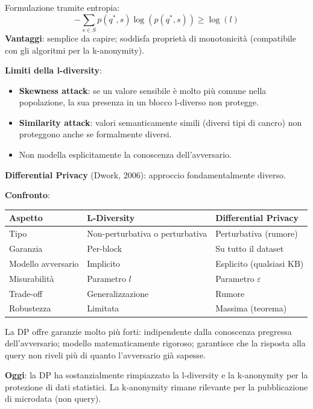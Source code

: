 \documentclass[a4paper,11pt]{article}
\begin{document}
Formulazione tramite entropia:
\[
-\sum_{s \in S} p(q^*, s) \log(p(q^*, s)) \geq \log(l)
\]
\textbf{Vantaggi}: semplice da capire; soddisfa propriet\`{a} di monotonicità (compatibile con gli algoritmi per la k-anonymity).

\textbf{Limiti della l-diversity}:
\begin{itemize}
  \item \textbf{Skewness attack}: se un valore sensibile \`{e} molto pi\`{u} comune nella popolazione, la sua presenza in un blocco l-diverso non protegge.
  \item \textbf{Similarity attack}: valori semanticamente simili (diversi tipi di cancro) non proteggono anche se formalmente diversi.
  \item Non modella esplicitamente la conoscenza dell'avversario.
\end{itemize}

\textbf{Differential Privacy} (Dwork, 2006): approccio fondamentalmente diverso.

\textbf{Confronto}:
\begin{center}
\begin{tabular}{lll}
\toprule
\textbf{Aspetto} & \textbf{L-Diversity} & \textbf{Differential Privacy} \\
\midrule
Tipo & Non-perturbativa o perturbativa & Perturbativa (rumore) \\
Garanzia & Per-block & Su tutto il dataset \\
Modello avversario & Implicito & Esplicito (qualsiasi KB) \\
Misurabilit\`{a} & Parametro $l$ & Parametro $\varepsilon$ \\
Trade-off & Generalizzazione & Rumore \\
Robustezza & Limitata & Massima (teorema) \\
\bottomrule
\end{tabular}
\end{center}

La DP offre garanzie molto pi\`{u} forti: indipendente dalla conoscenza pregressa dell'avversario; modello matematicamente rigoroso; garantisce che la risposta alla query non riveli pi\`{u} di quanto l'avversario gi\`{a} sapesse.

\textbf{Oggi}: la DP ha sostanzialmente rimpiazzato la l-diversity e la k-anonymity per la protezione di dati statistici. La k-anonymity rimane rilevante per la pubblicazione di microdata (non query).
\end{document}
